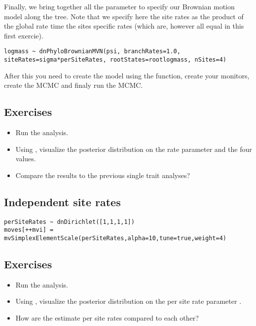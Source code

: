 Finally, we bring together all the parameter to specify our Brownian motion model along the tree. Note that we specify here the site rates as the product of the global rate  time the sites specific rates (which are, however all equal in this first exercie).
{\tt \small \begin{snugshade*}
\begin{lstlisting}
logmass ~ dnPhyloBrownianMVN(psi, branchRates=1.0, siteRates=sigma*perSiteRates, rootStates=rootlogmass, nSites=4)
\end{lstlisting}
\end{snugshade*}}

After this you need to create the model using the  function, create your monitors, create the MCMC and finaly run the MCMC.


\subsection*{Exercises}

\begin{itemize}
\item
Run the analysis.
\item
Using , visualize the posterior distribution on the rate parameter  and the four  values.
\item 
Compare the results to the previous single trait analyses?
\end{itemize}

\vspace{5cm}



\subsection{Independent site rates}

{\tt \small \begin{snugshade*}
\begin{lstlisting}
perSiteRates ~ dnDirichlet([1,1,1,1])
moves[++mvi] = mvSimplexElementScale(perSiteRates,alpha=10,tune=true,weight=4)
\end{lstlisting}
\end{snugshade*}}


\subsection*{Exercises}

\begin{itemize}
\item
Run the analysis.
\item
Using , visualize the posterior distribution on the per site rate parameter .
\item 
How are the estimate per site rates compared to each other?
\end{itemize}

